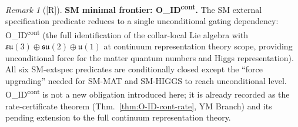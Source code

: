 \documentclass[12pt,oneside]{amsbook}
\theoremstyle{plain}
\theoremstyle{definition}
\theoremstyle{remark}
\newtheorem{remark}[theorem]{Remark}
\newcommand{\status}[1]{\textup{[#1]}}
\begin{document}
\begin{remark}[\status{R}]\label{rem:sm-extspec-frontier}
\textbf{SM minimal frontier: O\_ID\textsuperscript{cont}.}
The SM external specification predicate reduces to a single
unconditional gating dependency:
O\_ID\textsuperscript{cont} (the full identification of the
collar-local Lie algebra with $\mathfrak{su}(3)\oplus
\mathfrak{su}(2)\oplus\mathfrak{u}(1)$ at continuum representation
theory scope, providing unconditional force for the matter quantum
numbers and Higgs representation). All six SM-extspec predicates
are conditionally closed except the ``force upgrading'' needed for
SM-MAT and SM-HIGGS to reach unconditional level.
O\_ID\textsuperscript{cont} is not a new obligation introduced here;
it is already recorded as the rate-certificate theorem
(Thm.~\ref{thm:O-ID-cont-rate}, YM Branch) and its pending
extension to the full continuum representation theory.
\end{remark}
\end{document}
